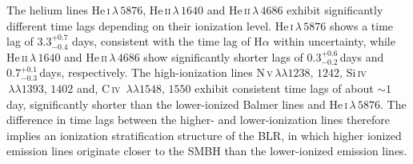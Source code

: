 The helium lines He\,\textsc{i}\,$\lambda\,5876$, He\,\textsc{ii}\,$\lambda\,1640$ and He\,\textsc{ii}\,$\lambda\,4686$ exhibit significantly different time lags depending on their ionization level. He\,\textsc{i}\,$\lambda\,5876$ shows a time lag of $3.3 \ensuremath{_{-0.4}^{+0.7}}$ days, consistent with the time lag of H$\alpha$ within uncertainty, while He\,\textsc{ii}\,$\lambda\,1640$ and He\,\textsc{ii}\,$\lambda\,4686$ show significantly shorter lags of $0.3 \ensuremath{_{-0.2}^{+0.6}}\,$days and $0.7 \ensuremath{_{-0.3}^{+0.1}}\,$days, respectively. The high-ionization lines N\,\textsc{v}$\,\lambda\lambda 1238,\,1242$, Si\,\textsc{iv}$\,\lambda\lambda 1393,\,1402$ and, C\,\textsc{iv} $\,\lambda\lambda 1548,\,1550$ exhibit consistent time lags of about $\sim 1\,$day, significantly shorter than the lower-ionized Balmer lines and He\,\textsc{i}\,$\lambda\,5876$. The difference in time lags between the higher- and lower-ionization lines therefore implies an ionization stratification structure of the BLR, in which higher ionized emission lines originate closer to the SMBH than the lower-ionized emission lines. 



